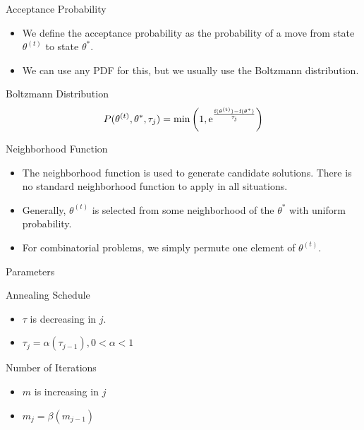 \documentclass[{pdf, t}]{beamer}
\begin{document}
\begin{frame}{Acceptance Probability}
\begin{itemize}
\item We define the acceptance probability as
the probability of a move from state $\theta^{(t)}$
to state $\theta^{*}$.
\item We can use any PDF for this, but we usually
use the Boltzmann distribution.
\end{itemize}
\begin{block}{Boltzmann Distribution}
\[
P(\theta^{(t)}, \theta^{*}, \tau_j)
= \rm{min}\left(1,
    \rm{e}^{\frac{f(\theta^{(t)}) - f(\theta^*)}{\tau_j}}\right)
\]
\end{block}
\end{frame}

\begin{frame}{Neighborhood Function}
\begin{itemize}
\item The neighborhood function is used to generate
candidate solutions. There is no standard neighborhood function to apply in all situations.
\item Generally, $\theta^{(t)}$ is selected from
some neighborhood of the $\theta^*$ with uniform
probability.
\item For combinatorial problems, we simply permute
one element of $\theta^{(t)}$.
\end{itemize}
\end{frame}


\begin{frame}{Parameters}
\begin{block}{Annealing Schedule}
\begin{itemize}
  \item $\tau$ is decreasing in $j$.
  \item $\tau_j = \alpha (\tau_{j-1}), 0 < \alpha < 1 $
\end{itemize}
\end{block}
\begin{block}{Number of Iterations}
\begin{itemize}
  \item $m$ is increasing in $j$
  \item $m_j = \beta(m_{j-1})$
\end{itemize}
\end{block}
\end{frame}
\end{document}
